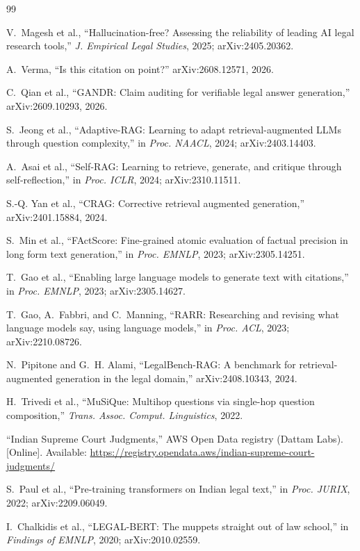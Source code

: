 \documentclass[conference]{IEEEtran}
\begin{document}
\begin{thebibliography}{99}

V.~Magesh et al.,
``Hallucination-free? Assessing the reliability of leading AI legal research tools,''
\textit{J. Empirical Legal Studies}, 2025; arXiv:2405.20362.

A.~Verma,
``Is this citation on point?''
arXiv:2608.12571, 2026.

C.~Qian et al.,
``GANDR: Claim auditing for verifiable legal answer generation,''
arXiv:2609.10293, 2026.

S.~Jeong et al.,
``Adaptive-RAG: Learning to adapt retrieval-augmented LLMs through question complexity,''
in \textit{Proc. NAACL}, 2024; arXiv:2403.14403.

A.~Asai et al.,
``Self-RAG: Learning to retrieve, generate, and critique through self-reflection,''
in \textit{Proc. ICLR}, 2024; arXiv:2310.11511.

S.-Q. Yan et al.,
``CRAG: Corrective retrieval augmented generation,''
arXiv:2401.15884, 2024.

S.~Min et al.,
``FActScore: Fine-grained atomic evaluation of factual precision in long form text generation,''
in \textit{Proc. EMNLP}, 2023; arXiv:2305.14251.

T.~Gao et al.,
``Enabling large language models to generate text with citations,''
in \textit{Proc. EMNLP}, 2023; arXiv:2305.14627.

T.~Gao, A.~Fabbri, and C.~Manning,
``RARR: Researching and revising what language models say, using language models,''
in \textit{Proc. ACL}, 2023; arXiv:2210.08726.

N.~Pipitone and G.~H. Alami,
``LegalBench-RAG: A benchmark for retrieval-augmented generation in the legal domain,''
arXiv:2408.10343, 2024.

H.~Trivedi et al.,
``MuSiQue: Multihop questions via single-hop question composition,''
\textit{Trans. Assoc. Comput. Linguistics}, 2022.

``Indian Supreme Court Judgments,''
AWS Open Data registry (Dattam Labs). [Online]. Available:
\url{https://registry.opendata.aws/indian-supreme-court-judgments/}

S.~Paul et al.,
``Pre-training transformers on Indian legal text,''
in \textit{Proc. JURIX}, 2022; arXiv:2209.06049.

I.~Chalkidis et al.,
``LEGAL-BERT: The muppets straight out of law school,''
in \textit{Findings of EMNLP}, 2020; arXiv:2010.02559.

\end{thebibliography}
\end{document}

